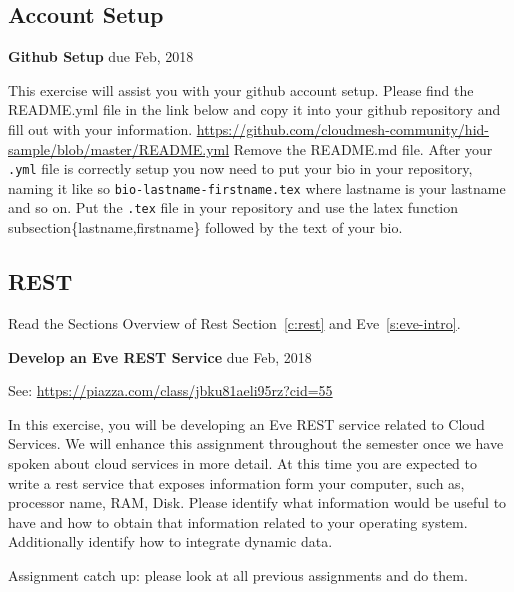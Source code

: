 \subsection{Account Setup}

\begin{exercise} {\bf Github Setup} due Feb, 2018

This exercise will assist you with your github account setup. Please
find the README.yml file in the link below and copy it into your
github repository and fill out with your
information. \url{https://github.com/cloudmesh-community/hid-sample/blob/master/README.yml}
Remove the README.md file. After your \verb|.yml| file is correctly setup you
now need to put your bio in your repository, naming it like so
\verb|bio-lastname-firstname.tex| where lastname is your lastname and so
on. Put the \verb|.tex| file in your repository and use the latex function
subsection\{lastname,firstname\} followed by the text of your bio.


\end{exercise}

\subsection{REST}
\begin{exercise}
Read the Sections Overview of Rest Section~\ref{c:rest} and Eve~\ref{s:eve-intro}.
\end{exercise}

\begin{exercise} {\bf Develop an Eve REST Service} due Feb, 2018

See: \url{https://piazza.com/class/jbku81aeli95rz?cid=55}

In this exercise, you will be developing an Eve REST service related
to Cloud Services. We will enhance this assignment throughout the
semester once we have spoken about cloud services in more detail. At
this time you are expected to write a rest service that exposes
information form your computer, such as, processor name, RAM,
Disk. Please identify what information would be useful to have and how
to obtain that information related to your operating
system. Additionally identify how to integrate dynamic data.


\end{exercise}

\begin{exercise}
Assignment catch up: please look at all previous assignments and do
them. 
\end{exercise}

